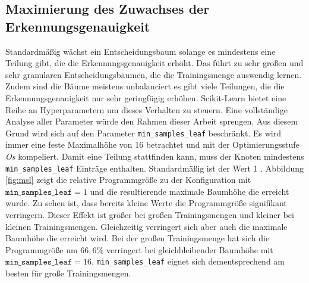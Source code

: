 \subsection{Maximierung des Zuwachses der Erkennungsgenauigkeit}
Standardmäßig wächst ein Entscheidungsbaum solange es mindestens eine Teilung gibt, die die Erkennungsgenauigkeit erhöht. Das führt zu sehr großen und sehr granularen Entscheidungsbäumen, die die Trainingsmenge
auswendig lernen. Zudem sind die Bäume meistens unbalanciert es gibt viele Teilungen, die die Erkennungsgenauigkeit nur sehr geringfügig erhöhen.
\newline
\newline
Scikit-Learn bietet eine Reihe an Hyperparametern um dieses Verhalten zu steuern. Eine vollständige Analyse aller Parameter würde den Rahmen dieser Arbeit sprengen. Aus diesem Grund wird sich auf
den Parameter \texttt{min\_samples\_leaf} beschränkt. Es wird immer eine feste Maximalhöhe von 16 betrachtet und mit der Optimierungsstufe \textit{Os} kompeliert.
\newline
\newline
{}
Damit eine Teilung stattfinden kann, muss der Knoten mindestens \texttt{min\_samples\_leaf} Einträge enthalten. Standardmäßig ist der Wert 1
\cite{ScikitLearnDTC}. Abbildung \ref{fig:msl} zeigt die relative Programmgröße zu der Konfiguration mit $\texttt{min\_samples\_leaf}=1$ und die resultierende maximale Baumhöhe die erreicht wurde.
Zu sehen ist, dass bereits kleine Werte die Programmgröße signifikant verringern. Dieser Effekt ist größer bei großen Trainingsmengen und kleiner bei kleinen Trainingsmengen. Gleichzeitig verringert
sich aber auch die maximale Baumhöhe die erreicht wird. Bei der großen Trainingsmenge hat sich die Programmgröße um $66,6\%$ verringert bei gleichbleibender Baumhöhe mit $\texttt{min\_samples\_leaf}=16$.
\texttt{min\_samples\_leaf} eignet sich dementsprechend am besten für große Trainingsmengen.